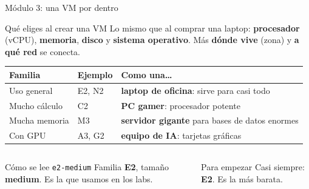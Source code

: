 \documentclass[aspectratio=169,10pt,c]{beamer}
\begin{document}
\begin{frame}{Módulo 3: una VM por dentro}
\begin{block}{Qué eliges al crear una VM}
\small Lo mismo que al comprar una laptop: \textbf{procesador} (vCPU), \textbf{memoria}, \textbf{disco} y \textbf{sistema operativo}. Más \textbf{dónde vive} (zona) y \textbf{a qué red} se conecta.
\end{block}
\renewcommand{\arraystretch}{1.3}
\centering\small
\begin{tabular}{@{}p{3.6cm}p{2.8cm}p{6.2cm}@{}}
\toprule
\textbf{Familia} & \textbf{Ejemplo} & \textbf{Como una\ldots}\\
\midrule
Uso general & E2, N2 & \textbf{laptop de oficina}: sirve para casi todo\\
Mucho cálculo & C2 & \textbf{PC gamer}: procesador potente\\
Mucha memoria & M3 & \textbf{servidor gigante} para bases de datos enormes\\
Con GPU & A3, G2 & \textbf{equipo de IA}: tarjetas gráficas\\
\bottomrule
\end{tabular}
\par\vspace{3mm}
\begin{columns}[T,onlytextwidth]
\begin{exampleblock}{Cómo se lee \texttt{e2-medium}}
\small Familia \textbf{E2}, tamaño \textbf{medium}. Es la que usamos en los labs.
\end{exampleblock}
\begin{alertblock}{Para empezar}
\small Casi siempre: \textbf{E2}. Es la más barata.
\end{alertblock}
\end{columns}
\end{frame}
\end{document}
